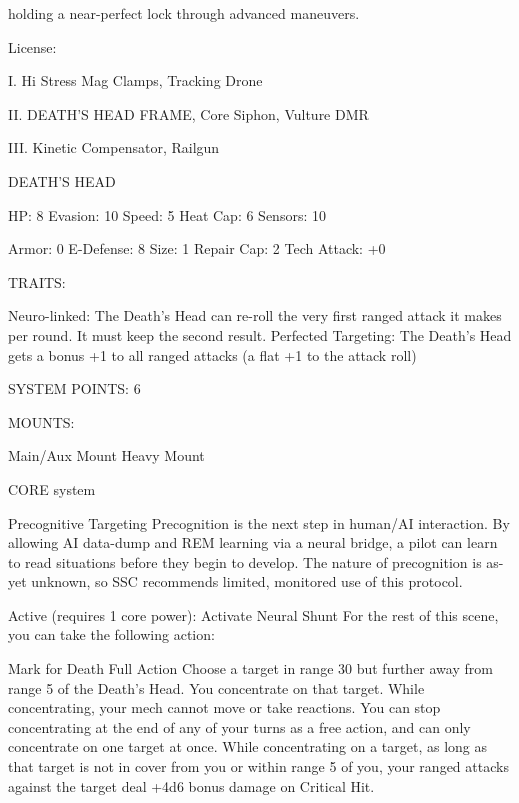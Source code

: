 holding a near-perfect lock through advanced maneuvers.   

                                                    License:
 
I. Hi Stress Mag Clamps, Tracking Drone
 
II. DEATH’S HEAD FRAME, Core Siphon, Vulture DMR
 
III. Kinetic Compensator, Railgun
 

                                               DEATH’S HEAD 

  HP: 8           Evasion: 10                           Speed: 5            Heat Cap: 6        Sensors: 10 

  Armor: 0        E-Defense: 8                          Size: 1             Repair Cap: 2      Tech Attack:  
                                                                                               +0 

                                                     TRAITS: 

  Neuro-linked: The Death’s Head can re-roll the very first ranged attack it makes per round. It must keep 
  the second result. 
  Perfected Targeting: The Death’s Head gets a bonus +1 to all ranged attacks (a flat +1 to the attack 
  roll) 

                                              SYSTEM POINTS: 6 

                                                    MOUNTS: 

  Main/Aux Mount                     Heavy Mount 

                                                  CORE system 

                                                                                                               


                                                 Precognitive Targeting  
  Precognition is the next step in human/AI interaction. By allowing AI data-dump and REM learning via a  
  neural bridge, a pilot can learn to read situations before they begin to develop. The nature of  
  precognition is as-yet unknown, so SSC recommends limited, monitored use of this protocol.   

  Active (requires 1 core power): Activate Neural Shunt  
   For the rest of this scene, you can take the following action:  

  Mark for Death 
  Full Action 
   Choose a target in range 30 but further away from range 5 of the Death’s Head. You concentrate on that 
  target. While concentrating, your mech cannot move or take reactions. You can stop concentrating at 
  the end of any of your turns as a free action, and can only concentrate on one target at once. 
  While concentrating on a target, as long as that target is not in cover from you or within range 5 of you, 
  your ranged attacks against the target deal +4d6 bonus damage on Critical Hit. 

